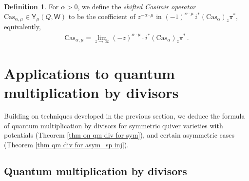 \documentclass[10pt]{amsart}
\theoremstyle{definition}
\newtheorem{Definition}[Theorem]{Definition}
\numberwithin{equation}{section}
\newcommand{\bv}{\mathbf{v}}
\newcommand{\bd}{\mathbf{d}}
\newcommand{\cM}{\mathcal{M}}
\newcommand{\sT}{\mathsf{T}}
\newcommand{\sW}{\mathsf{W}}
\newcommand{\sw}{\mathsf{w}}
\begin{document}
\begin{Definition}\label{def of shifted Casimir}
For $\alpha>0$, we define the \textit{shifted Casimir operator} $\mathrm{Cas}_{\alpha,\mu}\in \mathsf Y_\mu(Q,\sW)$ to be the coefficient of $z^{-\alpha\cdot \mu}$ in $(-1)^{\alpha\cdot\mu}\,i^*(\mathrm{Cas}_{\alpha})_z\pi^*$, equivalently,
\begin{align*}
    \mathrm{Cas}_{\alpha,\mu}=\lim_{z\to \infty} (-z)^{\alpha\cdot \mu}\cdot i^*(\mathrm{Cas}_{\alpha})_z\pi^*\,.
\end{align*}
\end{Definition}















\section{Applications to quantum multiplication by divisors}\label{sec quant mult}

Building on techniques developed in the previous section, we 
deduce the formula of quantum multiplication by divisors for symmetric quiver varieties with potentials (Theorem \ref{thm on qm div for sym}), 
and certain asymmetric cases (Theorem \ref{thm qm div for asym_sp inj}).


\subsection{Quantum multiplication by divisors}
\end{document}
